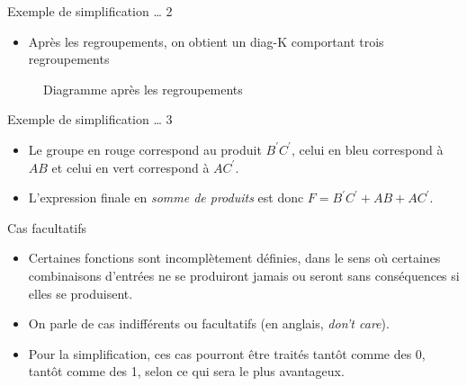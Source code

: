 \documentclass[presentation]{beamer}
\begin{document}
\begin{frame}[label={sec:orga8df3a9}]{Exemple de simplification \ldots{} 2}
\begin{itemize}
\item Après les regroupements, on obtient un diag-K comportant trois regroupements
\end{itemize}

\begin{figure}[htbp]
\centering

\caption{\label{fig:orgce6358f}Diagramme après les regroupements}
\end{figure}
\end{frame}

\begin{frame}[label={sec:orgc72ae11}]{Exemple de simplification \ldots{} 3}
\begin{itemize}
\item Le groupe en rouge correspond au produit \(B^\prime C^\prime\), celui en bleu correspond à \(A B\) et celui en vert correspond à \(A C^\prime\).

\item L'expression finale en \emph{somme de produits} est donc \(F = B^\prime C^\prime + A B + A C^\prime\).
\end{itemize}
\end{frame}

\begin{frame}[label={sec:orgded751b}]{Cas facultatifs}
\begin{itemize}
\item Certaines fonctions sont incomplètement définies, dans le sens où certaines combinaisons d'entrées ne se produiront jamais ou seront sans conséquences si elles se produisent.

\item On parle de \alert{cas indifférents} ou \alert{facultatifs} (en anglais, \emph{don't care}).

\item Pour la simplification, ces cas pourront être traités tantôt comme des 0, tantôt comme des 1, selon ce qui sera le plus avantageux.
\end{itemize}
\end{frame}
\end{document}
